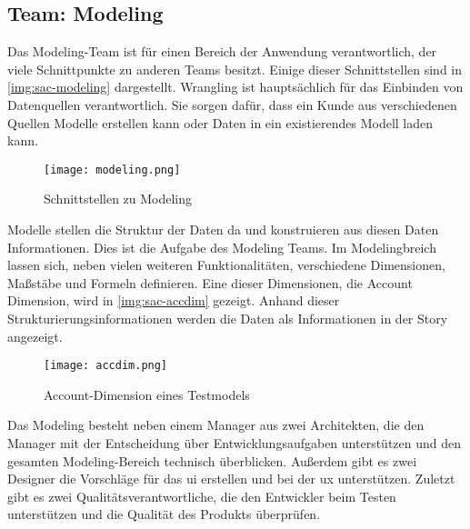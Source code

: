 \subsection{Team: Modeling}
Das Modeling-Team ist für einen Bereich der Anwendung verantwortlich, der viele Schnittpunkte zu anderen Teams besitzt.
Einige dieser Schnittstellen sind in \autoref{img:sac-modeling} dargestellt. Wrangling ist hauptsächlich für das 
Einbinden von Datenquellen verantwortlich. Sie sorgen dafür, dass ein Kunde aus verschiedenen Quellen Modelle erstellen kann oder Daten in 
ein existierendes Modell laden kann. 
\begin{figure}[ht]
	\centering
	\texttt{[image: modeling.png]}
	\caption{Schnittstellen zu Modeling}
	\label{img:sac-modeling}
\end{figure}

Modelle stellen die Struktur der Daten da und konstruieren aus diesen Daten Informationen. Dies ist die Aufgabe des Modeling Teams.
Im Modelingbreich lassen sich, neben vielen weiteren Funktionalitäten, verschiedene Dimensionen, Maßstäbe und Formeln definieren.
Eine dieser Dimensionen, die Account Dimension, wird in \autoref{img:sac-accdim} gezeigt. 
Anhand dieser Strukturierungsinformationen werden die Daten als Informationen in der Story angezeigt.
\begin{figure}[ht]
	\centering
	\texttt{[image: accdim.png]}
	\caption{Account-Dimension eines Testmodels}
	\label{img:sac-accdim}
\end{figure}

Das Modeling besteht neben einem Manager aus zwei Architekten, die den Manager mit der Entscheidung über 
Entwicklungsaufgaben unterstützen und den gesamten Modeling-Bereich technisch überblicken. Außerdem gibt es zwei Designer 
die Vorschläge für das \ac{ui} erstellen und bei der \ac{ux} unterstützen. Zuletzt gibt es zwei Qualitätsverantwortliche, die den Entwickler 
beim Testen unterstützen und die Qualität des Produkts überprüfen. 

